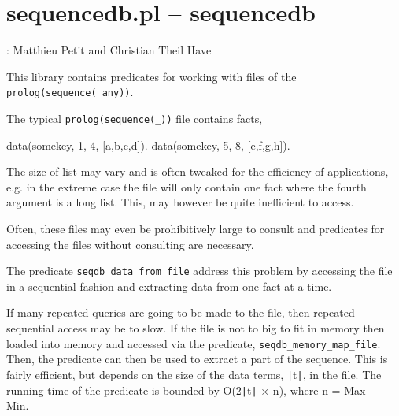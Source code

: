 


\section{sequencedb.pl -- sequencedb}

\label{sec:sequencedb}

\begin{tags}
: Matthieu Petit and Christian Theil Have
\end{tags}

This library contains predicates for working with files of the \verb$prolog(sequence(_any))$.

The typical \verb$prolog(sequence(_))$ file contains facts,

\begin{code}
data(somekey, 1, 4, [a,b,c,d]).
data(somekey, 5, 8, [e,f,g,h]).
\end{code}

The size of list may vary and is often tweaked for the efficiency of applications, e.g.
in the extreme case the file will only contain one fact where the fourth argument is a long list.
This, may however be quite inefficient to access.

Often, these files may even be prohibitively large to consult and predicates for accessing
the files without consulting are necessary.

The predicate \verb$seqdb_data_from_file$ address this problem by accessing the file in
a sequential fashion and extracting data from one fact at a time.

If many repeated queries are going to be made to the file, then repeated sequential access
may be to slow. If the file is not to big to fit in memory then loaded into memory and accessed
via the predicate, \verb$seqdb_memory_map_file$. Then, the predicate  can then be used
to extract a part of the sequence. This is fairly efficient, but depends on the size of the data terms,
{\tt\string|}t{\tt\string|}, in the file. The running time of the predicate is bounded by O(2{\tt\string|}t{\tt\string|} × n), where n = Max − Min.\vspace{0.7cm}

